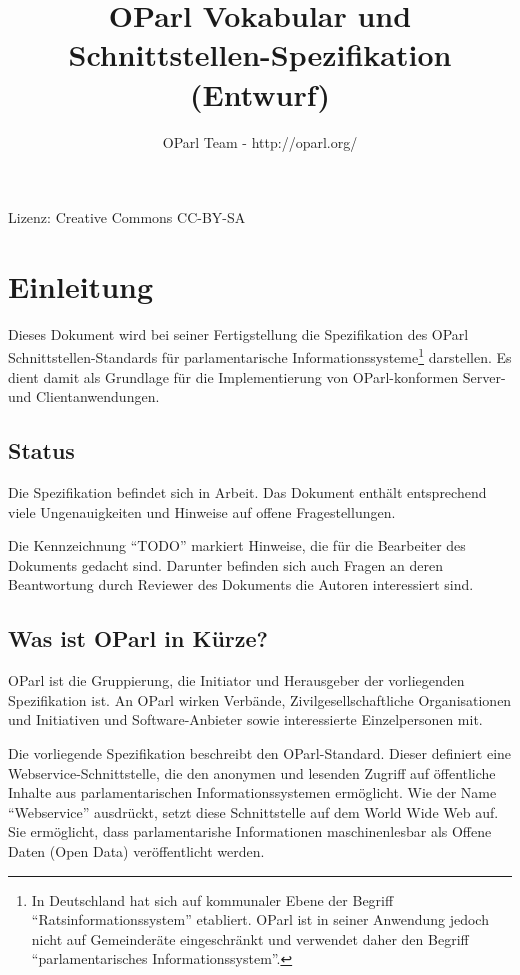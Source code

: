 \documentclass[,a4paper]{article}
\title{OParl Vokabular und Schnittstellen-Spezifikation (Entwurf)}
\author{OParl Team - http://oparl.org/}
\date{}
\begin{document}
\maketitle

Lizenz: Creative Commons CC-BY-SA

\section{Einleitung}\label{einleitung}

Dieses Dokument wird bei seiner Fertigstellung die Spezifikation des
OParl Schnittstellen-Standards für parlamentarische
Informationssysteme\footnote{In Deutschland hat sich auf kommunaler
  Ebene der Begriff ``Ratsinformationssystem'' etabliert. OParl ist in
  seiner Anwendung jedoch nicht auf Gemeinderäte eingeschränkt und
  verwendet daher den Begriff ``parlamentarisches Informationssystem''.}
darstellen. Es dient damit als Grundlage für die Implementierung von
OParl-konformen Server- und Clientanwendungen.

\subsection{Status}\label{status}

Die Spezifikation befindet sich in Arbeit. Das Dokument enthält
entsprechend viele Ungenauigkeiten und Hinweise auf offene
Fragestellungen.

Die Kennzeichnung ``TODO'' markiert Hinweise, die für die Bearbeiter des
Dokuments gedacht sind. Darunter befinden sich auch Fragen an deren
Beantwortung durch Reviewer des Dokuments die Autoren interessiert sind.

\subsection{Was ist OParl in Kürze?}\label{was-ist-oparl-in-kuxfcrze}

OParl ist die Gruppierung, die Initiator und Herausgeber der
vorliegenden Spezifikation ist. An OParl wirken Verbände,
Zivilgesellschaftliche Organisationen und Initiativen und
Software-Anbieter sowie interessierte Einzelpersonen mit.

Die vorliegende Spezifikation beschreibt den OParl-Standard. Dieser
definiert eine Webservice-Schnittstelle, die den anonymen und lesenden
Zugriff auf öffentliche Inhalte aus parlamentarischen
Informationssystemen ermöglicht. Wie der Name ``Webservice'' ausdrückt,
setzt diese Schnittstelle auf dem World Wide Web auf. Sie ermöglicht,
dass parlamentarishe Informationen maschinenlesbar als Offene Daten
(Open Data) veröffentlicht werden.
\end{document}
